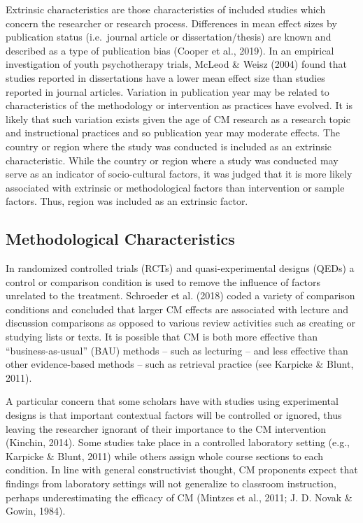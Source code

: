 \documentclass[
  letterpaper,
  DIV=11,
  numbers=noendperiod]{scrartcl}
\begin{document}
Extrinsic characteristics are those characteristics of included studies
which concern the researcher or research process. Differences in mean
effect sizes by publication status (i.e.~journal article or
dissertation/thesis) are known and described as a type of publication
bias (Cooper et al., 2019). In an empirical investigation of youth
psychotherapy trials, McLeod \& Weisz (2004) found that studies reported
in dissertations have a lower mean effect size than studies reported in
journal articles. Variation in publication year may be related to
characteristics of the methodology or intervention as practices have
evolved. It is likely that such variation exists given the age of CM
research as a research topic and instructional practices and so
publication year may moderate effects. The country or region where the
study was conducted is included as an extrinsic characteristic. While
the country or region where a study was conducted may serve as an
indicator of socio-cultural factors, it was judged that it is more
likely associated with extrinsic or methodological factors than
intervention or sample factors. Thus, region was included as an
extrinsic factor.

\hypertarget{methodological-characteristics}{%
\subsection{Methodological
Characteristics}\label{methodological-characteristics}}

In randomized controlled trials (RCTs) and quasi-experimental designs
(QEDs) a control or comparison condition is used to remove the influence
of factors unrelated to the treatment. Schroeder et al. (2018) coded a
variety of comparison conditions and concluded that larger CM effects
are associated with lecture and discussion comparisons as opposed to
various review activities such as creating or studying lists or texts.
It is possible that CM is both more effective than ``business-as-usual''
(BAU) methods -- such as lecturing -- and less effective than other
evidence-based methods -- such as retrieval practice (see Karpicke \&
Blunt, 2011).

A particular concern that some scholars have with studies using
experimental designs is that important contextual factors will be
controlled or ignored, thus leaving the researcher ignorant of their
importance to the CM intervention (Kinchin, 2014). Some studies take
place in a controlled laboratory setting (e.g., Karpicke \& Blunt, 2011)
while others assign whole course sections to each condition. In line
with general constructivist thought, CM proponents expect that findings
from laboratory settings will not generalize to classroom instruction,
perhaps underestimating the efficacy of CM (Mintzes et al., 2011; J. D.
Novak \& Gowin, 1984).
\end{document}
